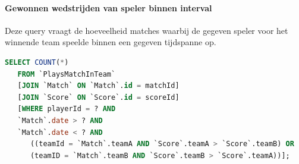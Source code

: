 \documentclass[11pt]{article}
\begin{document}
\paragraph{Gewonnen wedstrijden van speler binnen interval}

  Deze query vraagt de hoeveelheid matches waarbij de gegeven speler voor het winnende team speelde binnen een gegeven tijdspanne op.

  \begin{framed}
  \begin{lstlisting}[language=sql]
  SELECT COUNT(*)
   FROM `PlaysMatchInTeam`
   [JOIN `Match` ON `Match`.id = matchId]
   [JOIN `Score` ON `Score`.id = scoreId]
   [WHERE playerId = ? AND
   `Match`.date > ? AND
   `Match`.date < ? AND
      ((teamId = `Match`.teamA AND `Score`.teamA > `Score`.teamB) OR
      (teamID = `Match`.teamB AND `Score`.teamB > `Score`.teamA))];
  \end{lstlisting}
  \end{framed}
\end{document}
